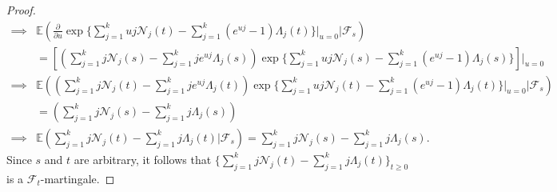 \documentclass[11pt,oneside,reqno]{amsart}
\theoremstyle{definition}
\theoremstyle{remarkstyle}
\begin{document}
\begin{proof}
\begin{align}
       \implies&\mathbb{E}\left(\frac{\partial}{\partial u}\exp\{\sum_{j=1}^{k}uj\mathcal{N}_j(t)-\sum_{j=1}^{k}(e^{uj}-1)\Lambda_j(t)\}\big|_{u=0}\bigg|\mathcal{F}_s\right)\nonumber\\
       &=\left[\left(\sum_{j=1}^{k}j\mathcal{N}_j(s)-\sum_{j=1}^{k}je^{uj}\Lambda_j(s)\right)\exp\{\sum_{j=1}^{k}uj\mathcal{N}_j(s)-\sum_{j=1}^{k}(e^{uj}-1)\Lambda_j(s)\}\right]\bigg|_{u=0}\nonumber\\ 
       \implies&\mathbb{E}\left(\left(\sum_{j=1}^{k}j\mathcal{N}_j(t)-\sum_{j=1}^{k}je^{uj}\Lambda_j(t)\right)\exp\{\sum_{j=1}^{k}uj\mathcal{N}_j(t)-\sum_{j=1}^{k}(e^{uj}-1)\Lambda_j(t)\}\big|_{u=0}\bigg|\mathcal{F}_s\right)\nonumber\\
       &=\left(\sum_{j=1}^{k}j\mathcal{N}_j(s)-\sum_{j=1}^{k}j\Lambda_j(s)\right)\nonumber\\
       \implies&\mathbb{E}\left(\sum_{j=1}^{k}j\mathcal{N}_j(t)-\sum_{j=1}^{k}j\Lambda_j(t)\bigg|\mathcal{F}_s\right)=\sum_{j=1}^{k}j\mathcal{N}_j(s)-\sum_{j=1}^{k}j\Lambda_j(s).\nonumber
    \end{align}
    Since $s$ and $t$ are arbitrary, it follows that $\{\sum_{j=1}^{k}j\mathcal{N}_j(t)-\sum_{j=1}^{k}j\Lambda_j(t)\}_{t\ge 0}$ is a $\mathcal{F}_t$-martingale.
\end{proof}
\end{document}

